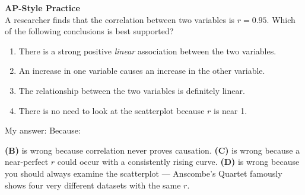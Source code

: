 \documentclass[10pt]{article}
\begin{document}
\begin{tcolorbox}[colback=redbg, colframe=redacc, boxrule=0.8pt, arc=2mm,
    left=4mm, right=4mm, top=3mm, bottom=3mm]
\small\textbf{AP-Style Practice}\\[6pt]
A researcher finds that the correlation between two variables is $r = 0.95$. Which of the
following conclusions is best supported?

\vspace{10pt}
\begin{enumerate}[label=\textbf{(\Alph*)}, leftmargin=2em, itemsep=6pt]
  \item {} There is a strong positive \emph{linear} association between the two variables.
  \item An increase in one variable causes an increase in the other variable.
  \item The relationship between the two variables is definitely linear.
  \item There is no need to look at the scatterplot because $r$ is near 1.
\end{enumerate}
\end{tcolorbox}

\vspace{0.1in}
\noindent\textcolor{slate}{\small My answer:  \quad Because: }

\begin{teachernote}
\textbf{(B)} is wrong because correlation never proves causation. \textbf{(C)} is wrong because
a near-perfect $r$ could occur with a consistently rising curve. \textbf{(D)} is wrong because
you should always examine the scatterplot --- Anscombe's Quartet famously shows four very
different datasets with the same $r$.
\end{teachernote}
\end{document}
